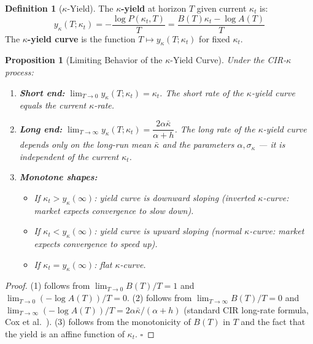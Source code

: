 \documentclass[10pt,twocolumn]{article}
\theoremstyle{plain}
\newtheorem{proposition}{Proposition}
\theoremstyle{definition}
\newtheorem{definition}{Definition}
\begin{document}
\begin{definition}[$\kappa$-Yield]
\label{def:kappa_yield}
The \textbf{$\kappa$-yield} at horizon $T$ given current
$\kappa_t$ is:
\begin{equation}
y_\kappa(T; \kappa_t) = -\frac{\log P(\kappa_t, T)}{T}
= \frac{B(T)\kappa_t - \log A(T)}{T}
\label{eq:kappa_yield}
\end{equation}
The \textbf{$\kappa$-yield curve} is the function
$T \mapsto y_\kappa(T; \kappa_t)$ for fixed $\kappa_t$.
\end{definition}

\begin{proposition}[Limiting Behavior of the $\kappa$-Yield Curve]
\label{prop:limits}
Under the CIR-$\kappa$ process:
\begin{enumerate}[leftmargin=*,noitemsep]
\item \textbf{Short end:}
$\lim_{T\to 0} y_\kappa(T;\kappa_t) = \kappa_t$.
The short rate of the $\kappa$-yield curve equals the
current $\kappa$-rate.
\item \textbf{Long end:}
$\lim_{T\to\infty} y_\kappa(T;\kappa_t) =
\dfrac{2\alpha\bar\kappa}{\alpha + h}$.
The long rate of the $\kappa$-yield curve depends only on
the long-run mean $\bar\kappa$ and the parameters
$\alpha, \sigma_\kappa$ --- it is independent of the
current $\kappa_t$.
\item \textbf{Monotone shapes:}
\begin{itemize}[leftmargin=*,noitemsep]
\item If $\kappa_t > y_\kappa(\infty)$: yield curve is
\emph{downward sloping} (inverted $\kappa$-curve:
market expects convergence to slow down).
\item If $\kappa_t < y_\kappa(\infty)$: yield curve is
\emph{upward sloping} (normal $\kappa$-curve: market
expects convergence to speed up).
\item If $\kappa_t = y_\kappa(\infty)$: flat $\kappa$-curve.
\end{itemize}
\end{enumerate}
\end{proposition}

\begin{proof}
(1) follows from $\lim_{T\to 0} B(T)/T = 1$ and
$\lim_{T\to 0} (-\log A(T))/T = 0$.
(2) follows from $\lim_{T\to\infty} B(T)/T = 0$ and
$\lim_{T\to\infty} (-\log A(T))/T = 2\alpha\bar\kappa/(\alpha + h)$
(standard CIR long-rate formula, Cox et al.\ \cite{CIR1985}).
(3) follows from the monotonicity of $B(T)$ in $T$ and the
fact that the yield is an affine function of $\kappa_t$.
\qquad$\square$
\end{proof}
\end{document}
